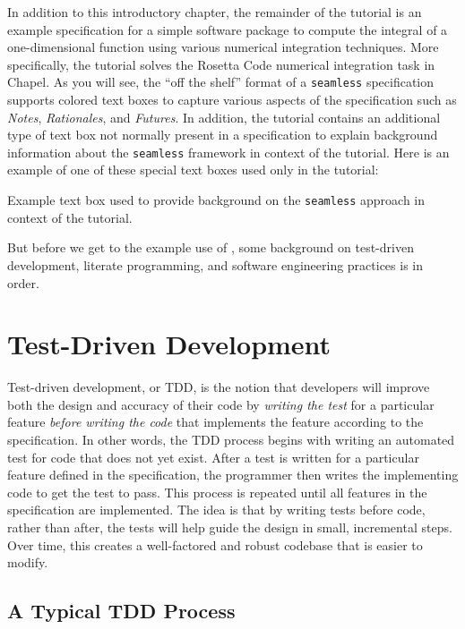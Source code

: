 In addition to this introductory chapter, the remainder of the tutorial is an example \seamless 
specification for a simple software package
to compute the integral of a one-dimensional function using various numerical integration techniques. 
More specifically, the tutorial solves the Rosetta Code numerical integration 
task\cite{rosetta-code-numerical-integration} in Chapel. 
As you will
see, the ``off the shelf'' format of a \lstinline{seamless} specification supports colored text boxes to capture
various aspects of the specification such as \textit{Notes}, \textit{Rationales}, and \textit{Futures}. In addition,
the tutorial contains an additional type of text box not normally present in a specification to explain 
background information about the \lstinline{seamless} framework in context of the tutorial. Here is an example of one
of these special text boxes used only in the tutorial:
\begin{seamlessnote}
  Example text box used to provide background on the \lstinline{seamless} approach in context of the tutorial.
\end{seamlessnote}
But before we get to the example use of \seamless, some background on test-driven development, literate programming,
and software engineering practices is in order.

\section{Test-Driven Development}
Test-driven development, or TDD, is the notion that developers will improve both the design and
accuracy of their code by \textit{writing the test} for a particular feature \textit{before writing the 
code} that implements the feature according to the specification. In other words, the TDD process 
begins with writing an automated test for code that does not yet 
exist. After a test is written for a particular feature defined in the specification, the 
programmer then writes the implementing code to get the test to pass. This process is repeated until
all features in the specification are implemented.  
The idea is that by writing tests before code, rather than after, the tests will help guide
the design in small, incremental steps. Over time, this creates a well-factored and robust
codebase that is easier to modify.

\subsection{A Typical TDD Process}\label{tdd-classic}

